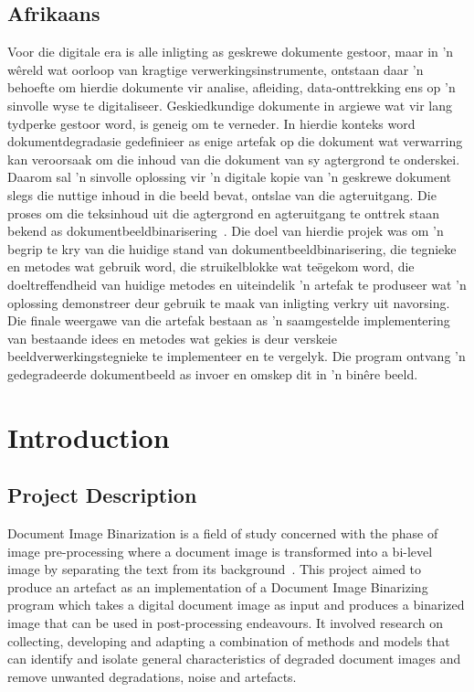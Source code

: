 \documentclass[a4paper, 12pt]{report}
\begin{document}
\section{Afrikaans}
Voor die digitale era is alle inligting as geskrewe dokumente gestoor, maar in
'n wêreld wat oorloop van kragtige verwerkingsinstrumente, ontstaan daar 'n
behoefte om hierdie dokumente vir analise, afleiding, data-onttrekking ens op
'n sinvolle wyse te digitaliseer. Geskiedkundige dokumente in argiewe wat vir
lang tydperke gestoor word, is geneig om te verneder. In hierdie konteks word
dokumentdegradasie gedefinieer as enige artefak op die dokument wat verwarring
kan veroorsaak om die inhoud van die dokument van sy agtergrond te onderskei.
Daarom sal 'n sinvolle oplossing vir 'n digitale kopie van 'n geskrewe dokument
slegs die nuttige inhoud in die beeld bevat, ontslae van die agteruitgang. Die
proses om die teksinhoud uit die agtergrond en agteruitgang te onttrek staan
bekend as dokumentbeeldbinarisering~\cite{su2012robust}. Die doel van hierdie
projek was om 'n begrip te kry van die huidige stand van
dokumentbeeldbinarisering, die tegnieke en metodes wat gebruik word, die
struikelblokke wat teëgekom word, die doeltreffendheid van huidige metodes en
uiteindelik 'n artefak te produseer wat 'n oplossing demonstreer deur gebruik
te maak van inligting verkry uit navorsing. Die finale weergawe van die artefak
bestaan as 'n saamgestelde implementering van bestaande idees en metodes wat
gekies is deur verskeie beeldverwerkingstegnieke te implementeer en te
vergelyk. Die program ontvang 'n gedegradeerde dokumentbeeld as invoer en
omskep dit in 'n binêre beeld.

\chapter{Introduction}

\section{Project Description}
Document Image Binarization is a field of study concerned with the phase of
image pre-processing where a document image is transformed into a bi-level
image by separating the text from its background~\cite{su2012robust}. This project aimed to produce an artefact as an implementation of a Document Image Binarizing program which takes a digital document image as input and produces a binarized image that can be used in post-processing endeavours. It involved research on collecting, developing and adapting a combination of methods and models that can identify and isolate general characteristics of degraded document images and remove unwanted degradations, noise and artefacts.
\end{document}
